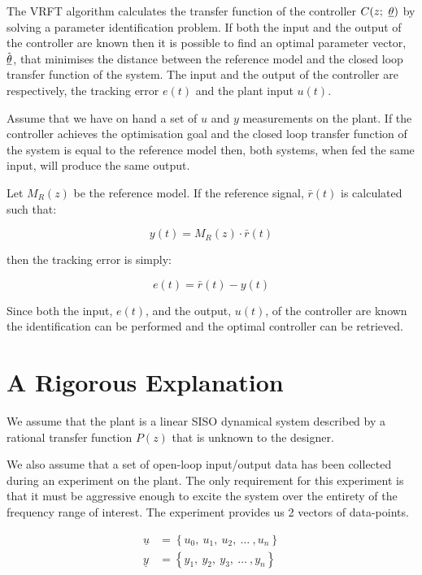 The VRFT algorithm calculates the transfer function of the controller \( C(z;\ \underline{\theta}) \) by solving a parameter identification problem. If both the input and the output of the controller are known then it is possible to find an optimal parameter vector, \( \hat{\underline{\theta}} \), that minimises the distance between the reference model and the closed loop transfer function of the system. The input and the output of the controller are respectively, the tracking error \( e(t) \) and the plant input \( u(t) \).

Assume that we have on hand a set of \( u \) and \( y \) measurements on the plant. If the controller achieves the optimisation goal and the closed loop transfer function of the system is equal to the reference model then, both systems, when fed the same input, will produce the same output. 

Let \( M_R(z) \) be the reference model. If the reference signal, \( \bar{r}(t) \) is calculated such that: 

\begin{equation}
    y(t) = M_R(z) \cdot \bar{r}(t)
\end{equation}

then the tracking error is simply:

\begin{equation}
    e(t) = \bar{r}(t) - y(t)
\end{equation}

Since both the input, \( e(t) \), and the output, \( u(t) \), of the controller are known the identification can be performed and the optimal controller can be retrieved.

\section{A Rigorous Explanation}
\label{sec:vrft_rigorous_expl}

We assume that the plant is a linear SISO dynamical system described by a rational transfer function \( P(z) \) that is unknown to the designer. 

We also assume that a set of open-loop input/output data has been collected during an experiment on the plant. The only requirement for this experiment is that it must be aggressive enough to excite the system over the entirety of the frequency range of interest. The experiment provides us 2 vectors of data-points.

\begin{align*}
    \underline{u} &= \left\{ u_0,\ u_1,\ u_2,\ \ldots\ , u_n \right\} \\
    \underline{y} &= \left\{ y_1,\ y_2,\ y_3,\ \ldots\ , y_n \right\}
\end{align*}

